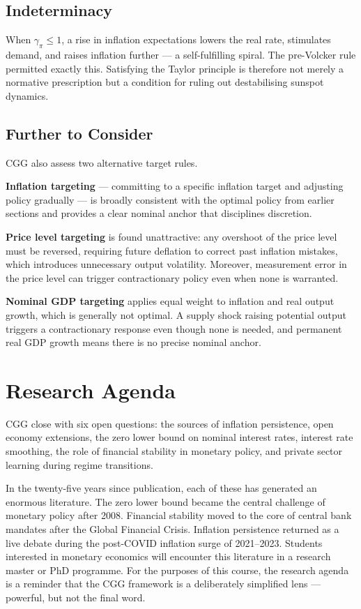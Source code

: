 \documentclass[11pt, a4paper]{article}
\begin{document}
\subsection*{Indeterminacy}

When $\gamma_\pi \leq 1$, a rise in inflation expectations lowers the real
rate, stimulates demand, and raises inflation further --- a self-fulfilling
spiral. The pre-Volcker rule permitted exactly this. Satisfying the Taylor
principle is therefore not merely a normative prescription but a condition for
ruling out destabilising sunspot dynamics.

\subsection*{Further to Consider}

CGG also assess two alternative target rules.

\textbf{Inflation targeting} --- committing to a specific inflation target
and adjusting policy gradually --- is broadly consistent with the optimal
policy from earlier sections and provides a clear nominal anchor that
disciplines discretion.

\textbf{Price level targeting} is found unattractive: any overshoot of the
price level must be reversed, requiring future deflation to correct past
inflation mistakes, which introduces unnecessary output volatility.
Moreover, measurement error in the price level can trigger contractionary
policy even when none is warranted.

\textbf{Nominal GDP targeting} applies equal weight to inflation and real
output growth, which is generally not optimal. A supply shock raising
potential output triggers a contractionary response even though none is
needed, and permanent real GDP growth means there is no precise nominal
anchor.

\section{Research Agenda}

CGG close with six open questions: the sources of inflation persistence, open
economy extensions, the zero lower bound on nominal interest rates, interest
rate smoothing, the role of financial stability in monetary policy, and
private sector learning during regime transitions.

In the twenty-five years since publication, each of these has generated an
enormous literature. The zero lower bound became the central challenge of
monetary policy after 2008. Financial stability moved to the core of central
bank mandates after the Global Financial Crisis. Inflation persistence
returned as a live debate during the post-COVID inflation surge of
2021--2023. Students interested in monetary economics will encounter this
literature in a research master or PhD programme. For the purposes of this
course, the research agenda is a reminder that the CGG framework is a
deliberately simplified lens --- powerful, but not the final word.
\end{document}
